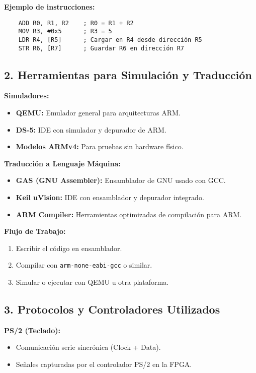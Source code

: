 \documentclass[conference]{IEEEtran}
\begin{document}
\textbf{Ejemplo de instrucciones:}
\begin{verbatim}
	ADD R0, R1, R2    ; R0 = R1 + R2
	MOV R3, #0x5      ; R3 = 5
	LDR R4, [R5]      ; Cargar en R4 desde dirección R5
	STR R6, [R7]      ; Guardar R6 en dirección R7
\end{verbatim}


\subsection*{2. Herramientas para Simulación y Traducción}

\textbf{Simuladores:}
\begin{itemize}
	\item \textbf{QEMU:} Emulador general para arquitecturas ARM.
	\item \textbf{DS-5:} IDE con simulador y depurador de ARM.
	\item \textbf{Modelos ARMv4:} Para pruebas sin hardware físico.
\end{itemize}

\textbf{Traducción a Lenguaje Máquina:}
\begin{itemize}
	\item \textbf{GAS (GNU Assembler):} Ensamblador de GNU usado con GCC.
	\item \textbf{Keil uVision:} IDE con ensamblador y depurador integrado.
	\item \textbf{ARM Compiler:} Herramientas optimizadas de compilación para ARM.
\end{itemize}

\textbf{Flujo de Trabajo:}
\begin{enumerate}
	\item Escribir el código en ensamblador.
	\item Compilar con \texttt{arm-none-eabi-gcc} o similar.
	\item Simular o ejecutar con QEMU u otra plataforma.
\end{enumerate}

\subsection*{3. Protocolos y Controladores Utilizados}

\textbf{PS/2 (Teclado):}
\begin{itemize}
	\item Comunicación serie sincrónica (Clock + Data).
	\item Señales capturadas por el controlador PS/2 en la FPGA.
\end{itemize}
\end{document}
